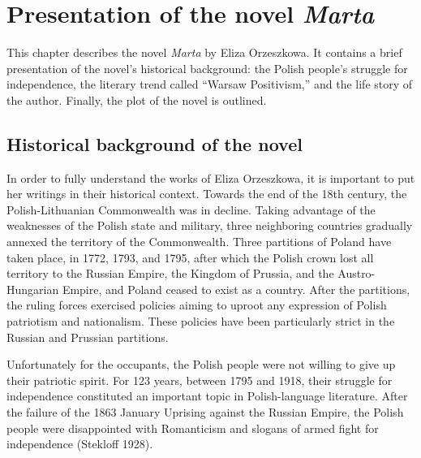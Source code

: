 
\chapter{Presentation of the novel \textit{Marta}}
This chapter describes the novel \textit{Marta} by Eliza Orzeszkowa.
It contains a brief presentation of the novel's historical background: the Polish people's struggle for independence, the literary trend called ``Warsaw Positivism,'' and the life story of the author.
Finally, the plot of the novel is outlined.

\section{Historical background of the novel}

In order to fully understand the works of Eliza Orzeszkowa, it is important to put her writings in their historical context.
Towards the end of the 18th century, the Polish-Lithuanian Commonwealth was in decline.
Taking advantage of the weaknesses of the Polish state and military, three neighboring countries gradually annexed the territory of the Commonwealth.
Three partitions of Poland have taken place, in 1772, 1793, and 1795, after which the Polish crown lost all territory to the Russian Empire, the Kingdom of Prussia, and the Austro-Hungarian Empire, and Poland ceased to exist as a country.
After the partitions, the ruling forces exercised policies aiming to uproot any expression of Polish patriotism and nationalism.
These policies have been particularly strict in the Russian and Prussian partitions.

Unfortunately for the occupants, the Polish people were not willing to give up their patriotic spirit.
For 123 years, between 1795 and 1918, their struggle for independence constituted an important topic in Polish-language literature.
After the failure of the 1863 January Uprising against the Russian Empire, the Polish people were disappointed with Romanticism and slogans of armed fight for independence
(Stekloff 1928).


